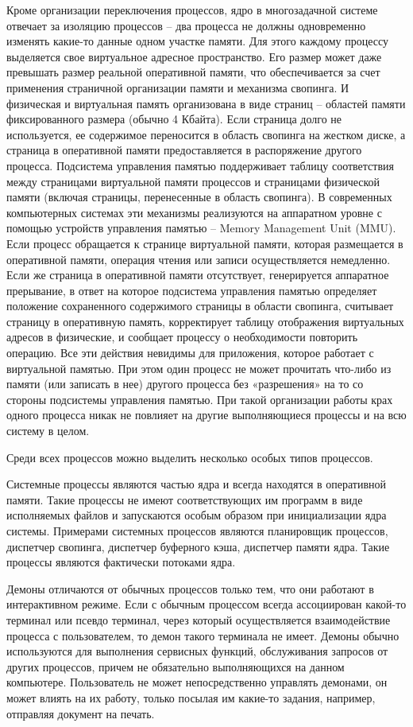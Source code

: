 Кроме организации переключения процессов, ядро в многозадачной системе отвечает за изоляцию процессов -- два процесса не должны одновременно изменять какие-то данные одном участке памяти. Для этого каждому процессу выделяется свое виртуальное адресное пространство. Его размер может даже превышать размер реальной оперативной памяти, что обеспечивается за счет применения страничной организации памяти и механизма свопинга. И физическая и виртуальная память организована в виде страниц -- областей памяти фиксированного размера (обычно 4 Кбайта). Если страница долго не используется, ее содержимое переносится в область свопинга на жестком диске, а страница в оперативной памяти предоставляется в распоряжение другого процесса. Подсистема управления памятью поддерживает таблицу соответствия между страницами виртуальной памяти процессов и страницами физической памяти (включая страницы, перенесенные в область свопинга). В современных компьютерных системах эти механизмы реализуются на аппаратном уровне с помощью устройств управления памятью -- Memory Management Unit (MMU). Если процесс обращается к странице виртуальной памяти, которая размещается в оперативной памяти, операция чтения или записи осуществляется немедленно. Если же страница в оперативной памяти отсутствует, генерируется аппаратное прерывание, в ответ на которое подсистема управления памятью определяет положение сохраненного содержимого страницы в области свопинга, считывает страницу в оперативную память, корректирует таблицу отображения виртуальных адресов в физические, и сообщает процессу о необходимости повторить операцию. Все эти действия невидимы для приложения, которое работает с виртуальной памятью. При этом один процесс не может прочитать что-либо из памяти (или записать в нее) другого процесса без «разрешения» на то со стороны подсистемы управления памятью. При такой организации работы крах одного процесса никак не повлияет на другие выполняющиеся процессы и на всю систему в целом.

Среди всех процессов можно выделить несколько особых типов процессов.

Системные процессы являются частью ядра и всегда находятся в оперативной памяти. Такие процессы не имеют соответствующих им программ в виде исполняемых файлов и запускаются особым образом при инициализации ядра системы. Примерами системных процессов являются планировщик процессов, диспетчер свопинга, диспетчер буферного кэша, диспетчер памяти ядра. Такие процессы являются фактически потоками ядра.

Демоны отличаются от обычных процессов только тем, что они работают в интерактивном режиме. Если с обычным процессом всегда ассоциирован какой-то терминал или псевдо терминал, через который осуществляется взаимодействие процесса с пользователем, то демон такого терминала не имеет. Демоны обычно используются для выполнения сервисных функций, обслуживания запросов от других процессов, причем не обязательно выполняющихся на данном компьютере. Пользователь не может непосредственно управлять демонами, он может влиять на их работу, только посылая им какие-то задания, например, отправляя документ на печать.

